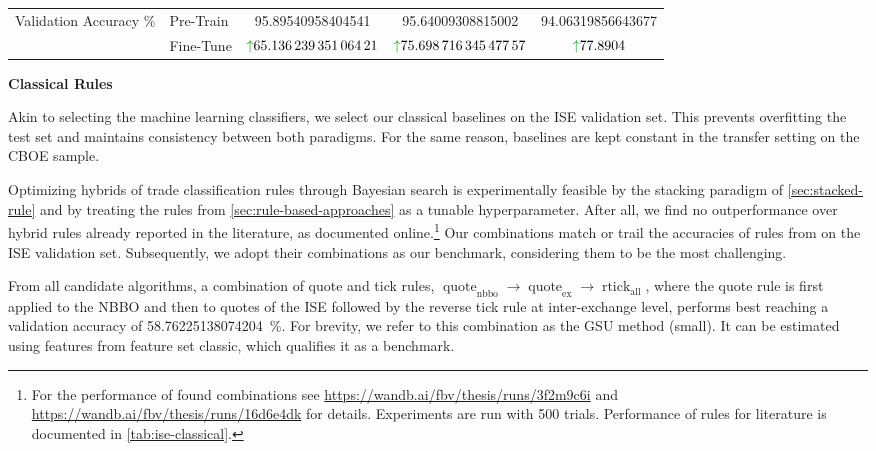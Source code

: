 \begin{table}[!ht]
\begin{tabular}{@{}llSSS@{}}
        Validation Accuracy \%               & Pre-Train                                           & {\num{95.89540958404541}}                                  & {\num{95.64009308815002}}                                   & {\num{94.06319856643677}}                         \\
                                             & Fine-Tune                                           & {$\textcolor{viz-green}{\uparrow}\num{65.13623935106421}$} & {$\textcolor{viz-green}{\uparrow} \num{75.69871634547757}$} & {$\textcolor{viz-green}{\uparrow} \num{77.8904}$} \\ \bottomrule
    \end{tabular}
\end{table}

\textbf{Classical Rules}

Akin to selecting the machine learning classifiers, we select our classical baselines on the \gls{ISE} validation set. This prevents \gls{overfitting} the test set and maintains consistency between both paradigms. For the same reason, baselines are kept constant in the transfer setting on the \gls{CBOE} sample.

Optimizing hybrids of trade classification rules through Bayesian search is experimentally feasible by the stacking paradigm of \cref{sec:stacked-rule} and by treating the rules from \cref{sec:rule-based-approaches} as a tunable hyperparameter. After all, we find no outperformance over hybrid rules already reported in the literature, as documented online.\footnote{For the performance of found combinations see \url{https://wandb.ai/fbv/thesis/runs/3f2m9c6i} and \url{https://wandb.ai/fbv/thesis/runs/16d6e4dk} for details. Experiments are run with \num{500} trials. Performance of rules for literature is documented in \cref{tab:ise-classical}.} Our combinations match or trail the accuracies of rules from \textcite[][13--15]{grauerOptionTradeClassification2022} on the \gls{ISE} validation set. Subsequently, we adopt their combinations as our benchmark, considering them to be the most challenging.

From all candidate algorithms, a combination of quote and tick rules, $\operatorname{quote}_{\mathrm{nbbo}} \to \operatorname{quote}_{\mathrm{ex}} \to \operatorname{rtick}_{\mathrm{all}}$, where the quote rule is first applied to the \gls{NBBO} and then to quotes of the \gls{ISE} followed by the reverse tick rule at inter-exchange level, performs best reaching a validation accuracy of \SI{58.76225138074204}{\percent}. For brevity, we refer to this combination as the \gls{GSU} method (small). It can be estimated using features from feature set classic, which qualifies it as a benchmark.

